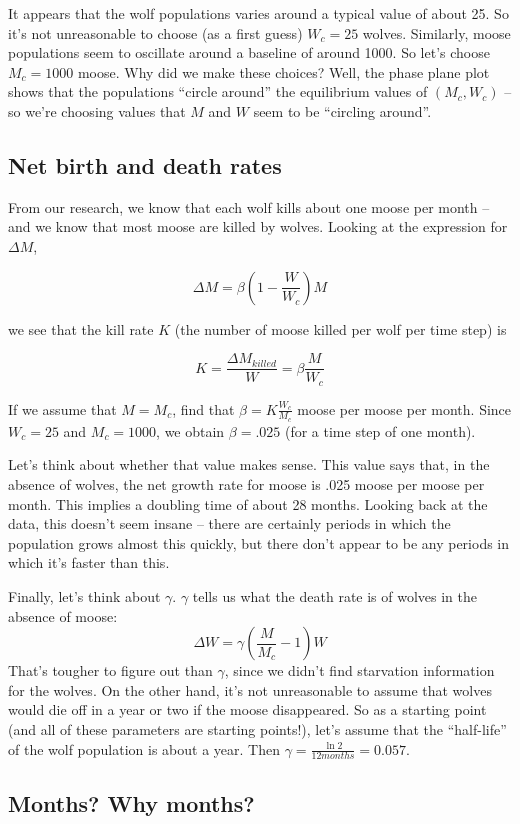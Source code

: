  It appears that the wolf populations varies around a typical value of about 25.  So it's not unreasonable to choose (as a first guess) $W_c = 25$ wolves.  Similarly, moose populations seem to oscillate around a baseline of around 1000.  So let's choose $M_c = 1000$ moose.  Why did we make these choices?  Well, the phase plane plot shows that the populations ``circle around'' the equilibrium values of $(M_c,W_c)$ -- so we're choosing values that $M$ and $W$ seem to be ``circling around''.

\subsection{Net birth and death rates}
From our research, we know that each wolf kills about one moose per month -- and we know that most moose are killed by wolves.  Looking at the expression for $\Delta M$, 

$$\Delta M = \beta(1-\frac{W}{W_c})M$$

we see that the kill rate $K$ (the number of moose killed per wolf per time step) is 

$$K = \frac{\Delta M_{killed}}{W} = \beta \frac{M}{W_c}$$

If we assume that $M=M_c$, find that  $ \beta = K \frac{W_c}{M_c}$ moose per moose per month.  Since $W_c = 25$ and $M_c = 1000$, we obtain $\beta = .025$ (for a time step of one month). 

Let's think about whether that value makes sense.  This value says that, in the absence of wolves, the net growth rate for moose is .025 moose per moose per month.  This implies a doubling time of about 28 months.   Looking back at the data, this doesn't seem insane -- there are certainly periods in which the population grows almost this quickly, but there don't appear to be any periods in which it's faster than this.

Finally, let's think about $\gamma$.  $\gamma$ tells us what the death rate is of wolves in the absence of moose:
$$\Delta W = \gamma(\frac{M}{M_c}-1)W$$
 That's tougher to figure out than $\gamma$, since we didn't find starvation information for the wolves.  On the other hand, it's not unreasonable to assume that wolves would die off in a year or two if the moose disappeared.  So as a starting point (and all of these parameters are starting points!), let's assume that the ``half-life'' of the wolf population is about a year.  Then $\gamma = \frac{\ln 2}{12 months} = 0.057$.

\subsection{Months?  Why months?}

